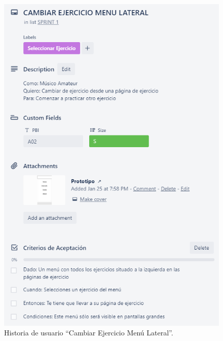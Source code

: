 \documentclass[12pt,twoside,titlepage]{report}
\begin{document}
\begin{figure}[H]
    \centering
    \includegraphics[scale=1.3]{Scrum/User Stories/MenuLateral}
    \caption{Historia de usuario ``Cambiar Ejercicio Menú Lateral''.}
    \label{fig:MenuLateral}
\end{figure}
\end{document}
